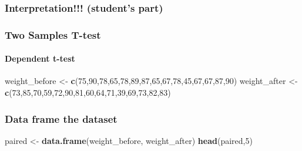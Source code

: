 \documentclass[
]{article}
\newenvironment{Shaded}{\begin{snugshade}}{\end{snugshade}}
\newcommand{\DecValTok}[1]{\textcolor[rgb]{0.00,0.00,0.81}{#1}}
\newcommand{\FunctionTok}[1]{\textcolor[rgb]{0.13,0.29,0.53}{\textbf{#1}}}
\newcommand{\NormalTok}[1]{#1}
\newcommand{\OtherTok}[1]{\textcolor[rgb]{0.56,0.35,0.01}{#1}}
\begin{document}
\hypertarget{interpretation-students-part}{%
\subsubsection{Interpretation!!! (student's
part)}\label{interpretation-students-part}}

\hypertarget{two-samples-t-test}{%
\subsubsection{Two Samples T-test}\label{two-samples-t-test}}

\hypertarget{dependent-t-test}{%
\paragraph{Dependent t-test}\label{dependent-t-test}}

\begin{Shaded}
\begin{Highlighting}[]
\NormalTok{weight\_before }\OtherTok{\textless{}{-}} \FunctionTok{c}\NormalTok{(}\DecValTok{75}\NormalTok{,}\DecValTok{90}\NormalTok{,}\DecValTok{78}\NormalTok{,}\DecValTok{65}\NormalTok{,}\DecValTok{78}\NormalTok{,}\DecValTok{89}\NormalTok{,}\DecValTok{87}\NormalTok{,}\DecValTok{65}\NormalTok{,}\DecValTok{67}\NormalTok{,}\DecValTok{78}\NormalTok{,}\DecValTok{45}\NormalTok{,}\DecValTok{67}\NormalTok{,}\DecValTok{67}\NormalTok{,}\DecValTok{87}\NormalTok{,}\DecValTok{90}\NormalTok{)}
\NormalTok{weight\_after }\OtherTok{\textless{}{-}} \FunctionTok{c}\NormalTok{(}\DecValTok{73}\NormalTok{,}\DecValTok{85}\NormalTok{,}\DecValTok{70}\NormalTok{,}\DecValTok{59}\NormalTok{,}\DecValTok{72}\NormalTok{,}\DecValTok{90}\NormalTok{,}\DecValTok{81}\NormalTok{,}\DecValTok{60}\NormalTok{,}\DecValTok{64}\NormalTok{,}\DecValTok{71}\NormalTok{,}\DecValTok{39}\NormalTok{,}\DecValTok{69}\NormalTok{,}\DecValTok{73}\NormalTok{,}\DecValTok{82}\NormalTok{,}\DecValTok{83}\NormalTok{)}
\end{Highlighting}
\end{Shaded}

\hypertarget{data-frame-the-dataset}{%
\subsubsection{Data frame the dataset}\label{data-frame-the-dataset}}

\begin{Shaded}
\begin{Highlighting}[]
\NormalTok{paired }\OtherTok{\textless{}{-}} \FunctionTok{data.frame}\NormalTok{(weight\_before, weight\_after)}
\FunctionTok{head}\NormalTok{(paired,}\DecValTok{5}\NormalTok{)}
\end{Highlighting}
\end{Shaded}
\end{document}
